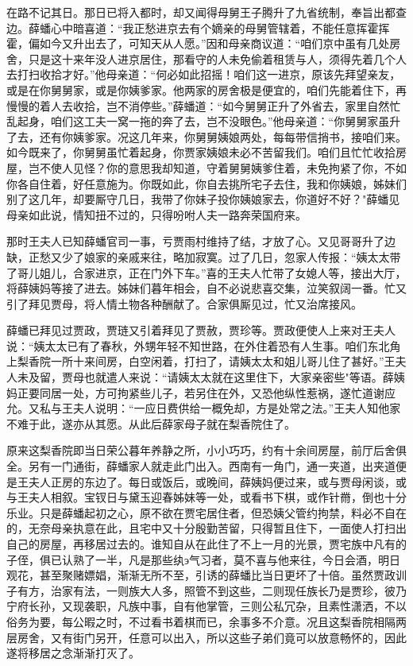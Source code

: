 在路不记其日。那日已将入都时，却又闻得母舅王子腾升了九省统制，奉旨出都查边。薛蟠心中暗喜道：“我正愁进京去有个嫡亲的母舅管辖着，不能任意挥霍挥霍，偏如今又升出去了，可知天从人愿。”因和母亲商议道：“咱们京中虽有几处房舍，只是这十来年没人进京居住，那看守的人未免偷着租赁与人，须得先着几个人去打扫收拾才好。”他母亲道：“何必如此招摇！咱们这一进京，原该先拜望亲友，或是在你舅舅家，或是你姨爹家。他两家的房舍极是便宜的，咱们先能着住下，再慢慢的着人去收拾，岂不消停些。”薛蟠道：“如今舅舅正升了外省去，家里自然忙乱起身，咱们这工夫一窝一拖的奔了去，岂不没眼色。”他母亲道：“你舅舅家虽升了去，还有你姨爹家。况这几年来，你舅舅姨娘两处，每每带信捎书，接咱们来。如今既来了，你舅舅虽忙着起身，你贾家姨娘未必不苦留我们。咱们且忙忙收拾房屋，岂不使人见怪？你的意思我却知道，守着舅舅姨爹住着，未免拘紧了你，不如你各自住着，好任意施为。你既如此，你自去挑所宅子去住，我和你姨娘，姊妹们别了这几年，却要厮守几日，我带了你妹子投你姨娘家去，你道好不好？"薛蟠见母亲如此说，情知扭不过的，只得吩咐人夫一路奔荣国府来。

那时王夫人已知薛蟠官司一事，亏贾雨村维持了结，才放了心。又见哥哥升了边缺，正愁又少了娘家的亲戚来往，略加寂寞。过了几日，忽家人传报：“姨太太带了哥儿姐儿，合家进京，正在门外下车。”喜的王夫人忙带了女媳人等，接出大厅，将薛姨妈等接了进去。姊妹们暮年相会，自不必说悲喜交集，泣笑叙阔一番。忙又引了拜见贾母，将人情土物各种酬献了。合家俱厮见过，忙又治席接风。

薛蟠已拜见过贾政，贾琏又引着拜见了贾赦，贾珍等。贾政便使人上来对王夫人说：“姨太太已有了春秋，外甥年轻不知世路，在外住着恐有人生事。咱们东北角上梨香院一所十来间房，白空闲着，打扫了，请姨太太和姐儿哥儿住了甚好。”王夫人未及留，贾母也就遣人来说：“请姨太太就在这里住下，大家亲密些"等语。薛姨妈正要同居一处，方可拘紧些儿子，若另住在外，又恐他纵性惹祸，遂忙道谢应允。又私与王夫人说明：“一应日费供给一概免却，方是处常之法。”王夫人知他家不难于此，遂亦从其愿。从此后薛家母子就在梨香院住了。

原来这梨香院即当日荣公暮年养静之所，小小巧巧，约有十余间房屋，前厅后舍俱全。另有一门通街，薛蟠家人就走此门出入。西南有一角门，通一夹道，出夹道便是王夫人正房的东边了。每日或饭后，或晚间，薛姨妈便过来，或与贾母闲谈，或与王夫人相叙。宝钗日与黛玉迎春姊妹等一处，或看书下棋，或作针黹，倒也十分乐业。只是薛蟠起初之心，原不欲在贾宅居住者，但恐姨父管约拘禁，料必不自在的，无奈母亲执意在此，且宅中又十分殷勤苦留，只得暂且住下，一面使人打扫出自己的房屋，再移居过去的。谁知自从在此住了不上一月的光景，贾宅族中凡有的子侄，俱已认熟了一半，凡是那些纨э气习者，莫不喜与他来往，今日会酒，明日观花，甚至聚赌嫖娼，渐渐无所不至，引诱的薛蟠比当日更坏了十倍。虽然贾政训子有方，治家有法，一则族大人多，照管不到这些，二则现任族长乃是贾珍，彼乃宁府长孙，又现袭职，凡族中事，自有他掌管，三则公私冗杂，且素性潇洒，不以俗务为要，每公暇之时，不过看书着棋而已，余事多不介意。况且这梨香院相隔两层房舍，又有街门另开，任意可以出入，所以这些子弟们竟可以放意畅怀的，因此遂将移居之念渐渐打灭了。

